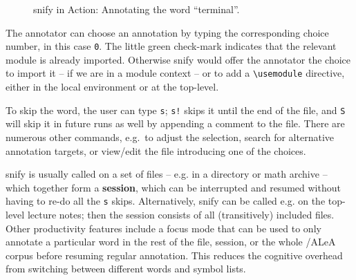 \documentclass[runningheads]{llncs}
\newcommand\ALeA{\textsf{ALeA}\xspace}
\newcommand\snify{\textsf{snify}\xspace}
\begin{document}
\begin{figure}[ht]
  \setlength{\fboxsep}{0pt}
  \caption{\snify in Action: Annotating the word ``terminal''.}\label{fig:snify}
\end{figure}

The annotator can choose an annotation by typing the corresponding choice number,
in this case \lstinline|0|.
The little green check-mark indicates that the relevant module is already imported.
Otherwise \snify would offer the annotator the choice to import it -- if we are
in a module context -- or to add a \lstinline|\usemodule| directive, either in the
local environment or at the top-level.

To skip the word, the user can type \lstinline|s|;
\lstinline|s!| skips it until the end of the file, and \lstinline|S|
will skip it in future runs as well by appending a comment to the file.
There are numerous other commands, e.g.\ to adjust the selection,
search for alternative annotation targets,
or view/edit the file introducing one of the choices.

\snify is usually called on a set of files -- e.g. in a directory or math archive -- which
together form a \textbf{session}, which can be interrupted and resumed without having to
re-do all the \lstinline|s| skips. Alternatively, \snify can be called e.g. on the
top-level lecture notes; then the session consists of all (transitively) included
files. Other productivity features include a focus mode that can be used to only annotate
a particular word in the rest of the file, session, or the whole \sTeX/\ALeA corpus before
resuming regular annotation. This reduces the cognitive overhead from switching between
different words and symbol lists.
\end{document}
